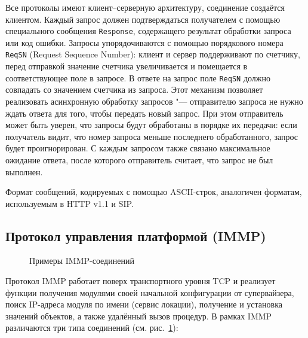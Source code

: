 Все протоколы имеют клиент--серверную архитектуру, соединение создаётся клиентом. Каждый запрос должен подтверждаться получателем с помощью специального сообщения \texttt{Response}, содержащего результат обработки запроса или код ошибки. Запросы упорядочиваются с помощью порядкового номера \texttt{ReqSN} (Request Sequence Number): клиент и сервер поддерживают по счетчику, перед отправкой значение счетчика увеличивается и помещается в соответствующее поле в запросе. В ответе на запрос поле \texttt{ReqSN} должно совпадать со значением счетчика из запроса. Этот механизм позволяет реализовать асинхронную обработку запросов "--- отправителю запроса не нужно ждать ответа для того, чтобы передать новый запрос. При этом отправитель может быть уверен, что запросы будут обработаны в порядке их передачи: если получатель видит, что номер запроса меньше последнего обработанного, запрос будет проигнорирован. С каждым запросом также связано максимальное ожидание ответа, после которого отправитель считает, что запрос не был выполнен.

Формат сообщений, кодируемых с помощью ASCII-строк, аналогичен форматам, используемым в HTTP v1.1 и SIP.


\subsection{Протокол управления платформой (IMMP)}\label{sec:ch5_immp}

\begin{figure}[ht]
  \caption{Примеры IMMP-соединений}
  \label{fig:ch5_immp_connections}
\end{figure}

Протокол IMMP работает поверх транспортного уровня TCP и реализует функции получения модулями своей начальной конфигурации от супервайзера, поиск IP-адреса модуля по имени (сервис локации), получение и установка значений объектов, а также удалённый вызов процедур. В рамках IMMP различаются три типа соединений (см. рис.~\ref{fig:ch5_immp_connections}):

